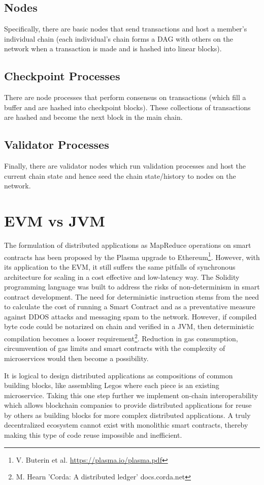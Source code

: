 \documentclass{article}
\begin{document}
\subsection{Nodes}
Specifically, there are basic nodes that send transactions and host a member's individual chain (each individual's chain forms a DAG with others on the network when a transaction is made and is hashed into linear blocks). 

\subsection{Checkpoint Processes}
There are node processes that perform consensus on transactions (which fill a buffer and are hashed into checkpoint blocks). These collections of transactions are hashed and become the next block in the main chain. 

\subsection{Validator Processes}
Finally, there are validator nodes which run validation processes and host the current chain state and hence seed the chain state/history to nodes on the network. 

\section{EVM vs JVM}
The formulation of distributed applications as MapReduce operations on smart contracts has been proposed by the Plasma upgrade to Ethereum\footnote{V. Buterin et al. \url{https://plasma.io/plasma.pdf}}. However, with its application to the EVM, it still suffers the same pitfalls of synchronous architecture for scaling in a cost effective and low-latency way. The Solidity programming language was built to address the risks of non-determinism in smart contract development. The need for deterministic instruction stems from the need to calculate the cost of running a Smart Contract and as a preventative measure against DDOS attacks and messaging spam to the network. However, if compiled byte code could be notarized on chain and verified in a JVM, then deterministic compilation becomes a looser requirement\footnote{M. Hearn 'Corda: A distributed ledger'  docs.corda.net}. Reduction in gas consumption, circumvention of gas limits and smart contracts with the complexity of microservices would then become a possibility.

It is logical to design distributed applications as compositions of common building blocks, like assembling Legos where each piece is an existing microservice. Taking this one step further we implement on-chain interoperability which allows blockchain companies to provide distributed applications for reuse by others as building blocks for more complex distributed applications. A truly decentralized ecosystem cannot exist with monolithic smart contracts, thereby making this type of code reuse impossible and inefficient. 
\end{document}
